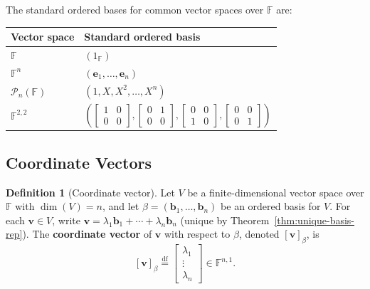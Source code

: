 \documentclass[11pt, a4paper, notitlepage]{report}
\theoremstyle{definition}
\newtheorem{definition}[theorem]{Definition}
\theoremstyle{remark}
\begin{document}
The standard ordered bases for common vector spaces over $\mathbb{F}$ are:

\begin{center}
\begin{tabular}{ll}
  \hline
  Vector space & Standard ordered basis \\
  \hline
  $\mathbb{F}$ & $(1_\mathbb{F})$ \\
  $\mathbb{F}^n$ & $(\mathbf{e}_1, \ldots, \mathbf{e}_n)$ \\
  $\mathscr{P}_n(\mathbb{F})$ & $(1, X, X^2, \ldots, X^n)$ \\
  $\mathbb{F}^{2,2}$ & $\left(\begin{bmatrix}1&0\\0&0\end{bmatrix}, \begin{bmatrix}0&1\\0&0\end{bmatrix}, \begin{bmatrix}0&0\\1&0\end{bmatrix}, \begin{bmatrix}0&0\\0&1\end{bmatrix}\right)$ \\
  \hline
\end{tabular}
\end{center}

\subsection{Coordinate Vectors}

\begin{definition}[Coordinate vector]\label{def:coordinate-vector}
Let $V$ be a finite-dimensional vector space over $\mathbb{F}$ with $\dim(V) = n$, and let
$\beta = (\mathbf{b}_1, \ldots, \mathbf{b}_n)$ be an ordered basis for $V$.
For each $\mathbf{v} \in V$, write $\mathbf{v} = \lambda_1 \mathbf{b}_1 + \cdots + \lambda_n \mathbf{b}_n$ (unique by Theorem~\ref{thm:unique-basis-rep}).
The \textbf{coordinate vector} of $\mathbf{v}$ with respect to $\beta$, denoted $[\mathbf{v}]_\beta$, is
\[
  [\mathbf{v}]_\beta \stackrel{\mathrm{df}}{=}
  \begin{bmatrix}\lambda_1 \\ \vdots \\ \lambda_n\end{bmatrix} \in \mathbb{F}^{n,1}.
\]
\end{definition}
\end{document}
